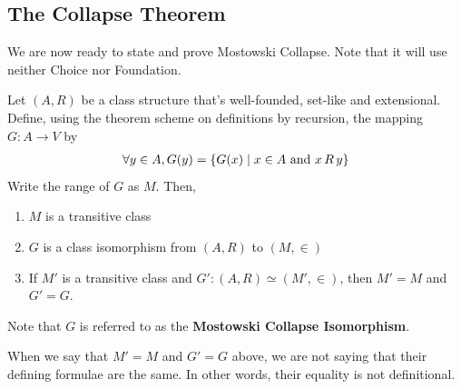 \subsection{The Collapse Theorem}

We are now ready to state and prove Mostowski Collapse. Note that it will use neither Choice nor Foundation.

\begin{boxtheorem}\label{Ch2:Thm:Mostowski}
    Let $(A, R)$ be a class structure that's well-founded, set-like and extensional. Define, using the theorem scheme on definitions by recursion, the mapping $G : A \to V$ by
    \begin{align*}
        \forall y \in A, G(y) = \left\{ G(x) \; \middle\vert \; x \in A \text{ and } x \, R \, y \right\}
    \end{align*}
    Write the range of $G$ as $M$. Then,
    \begin{enumerate}
        \item $M$ is a transitive class
        \item $G$ is a class isomorphism from $(A, R)$ to $(M, \in)$
        \item If $M'$ is a transitive class and $G' : (A, R) \simeq (M', \in)$, then $M' = M$ and $G' = G$.
    \end{enumerate}
    Note that $G$ is referred to as the \textbf{Mostowski Collapse Isomorphism}.
\end{boxtheorem}
\begin{remark}
    When we say that $M' = M$ and $G' = G$ above, we are not saying that their defining formulae are the same. In other words, their equality is not definitional.
\end{remark}
